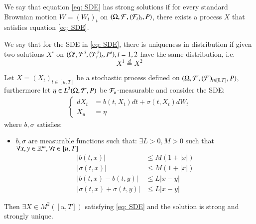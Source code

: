 \begin{definition}
We say that equation \ref{eq: SDE} has strong solutions if for every standard Brownian motion $W = (W_{t})_{t}$ on $(\Omega, \mathcal{F}, (\mathcal{F}_{t})_{t}, P)$, there exists a process $X$ that satisfies equation \ref{eq: SDE}.    
\end{definition} 

\begin{definition}
We say that for the SDE in \ref{eq: SDE}, there is uniqueness in distribution if given two solutions $X^{i}$ on $(\Omega^{i}, \mathcal{F}^{i}, (\mathcal{F}_{t}^{i})_{t}, P^{i}), i = 1,2$ have the same distribution, i.e.
\[
X^{1} \stackrel{d}{=} X^{2}
\]
\end{definition}

\newpage 
\begin{theorem}
\label{thm: SDE_sufficiency}
Let $X = (X_{t})_{t\in [u,T]}$ be a stochastic process defined on $(\Omega, \mathcal{F}, (\mathcal{F})_{t\in [0,T]}, P)$, furthermore let $\eta \in L^{2}(\Omega, \mathcal{F}, P)$ be $\mathcal{F}_{u}$-measurable and consider the SDE:
\begin{align}
\label{eq: SDE}
\begin{cases}
      dX_{t} &= b(t,X_{t})dt + \sigma(t,X_{t})dW_{t} \\
      X_{u}  &= \eta
    \end{cases}    
\end{align}
where $b, \sigma$ satisfies:
\begin{itemize}[leftmargin =*]
    \item $b,\sigma$ are measurable functions such that: $\exists L >0, M >0$ such that $\forall x,y \in \mathbb{R}^{m}, \forall t \in [u,T]$ 
    \begin{align*}
    |b(t,x)|                  &\leq M(1+|x|) \\ 
    |\sigma(t,x)|             &\leq M(1+|x|) \\ 
    |b(t,x) - b(t,y)|         &\leq L|x-y| \\ 
    |\sigma(t,x)+\sigma(t,y)| &\leq L|x-y|
    \end{align*}
\end{itemize}
Then $\exists X \in M^{2}([u,T])$ satisfying \ref{eq: SDE} and the solution is strong and strongly unique.
\end{theorem}












